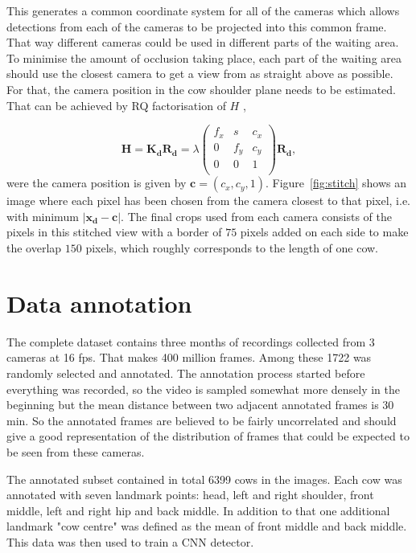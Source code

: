 \documentclass{cta-author}
\begin{document}
This generates a common coordinate system for all of the cameras which allows detections from each of the cameras to be projected into this common frame. That way different cameras could be used in different parts of the waiting area. To minimise the amount of occlusion taking place, each part of the waiting area should use the closest camera to get a view from as straight above as possible. For that, the camera position in the cow shoulder plane needs to be estimated. That can be achieved by RQ factorisation of $H$ \cite{Hartley2004}, 

\begin{equation}
\bm H = \bm {K_d} \bm {R_d} = 
    \lambda
	\left(
	\begin{array}{ccc}
		f_x & s & c_x  \\
		0 & f_y & c_y  \\
		0 & 0 & 1  \\
	\end{array}
	\right)
	\bm {R_d} ,
\end{equation}
were the camera position is given by $\bm c = \left(c_x, c_y, 1\right)$. Figure~\ref{fig:stitch} shows an image where each pixel has been chosen from the camera closest to that pixel, i.e. with  minimum $\left| \bm {x_d} - \bm c \right|$. The final crops used from each camera consists of the pixels in this stitched view with a border of $75$ pixels added on each side to make the overlap $150$ pixels, which roughly corresponds to the length of one cow.


\section{Data annotation}

The complete dataset contains three months of recordings collected from 3 cameras at 16 fps. That makes 400 million frames. Among these 1722 was randomly selected and annotated. The annotation process started before everything was recorded, so the video is sampled somewhat more densely in the beginning but the mean distance between two adjacent annotated frames is 30 min. So the annotated frames are believed to be fairly uncorrelated and should give a good representation of the distribution of frames that could be expected to be seen from these cameras.

The annotated subset contained in total 6399 cows in the images. Each cow was annotated with seven landmark points: head, left and right shoulder, front middle, left and right hip and back middle. In addition to that one additional landmark "cow centre" was defined as the mean of front middle and back middle. This data was then used to train a CNN detector.
\end{document}
